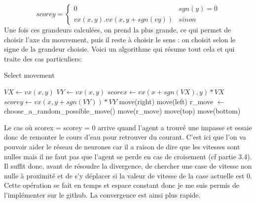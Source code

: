 \documentclass[10pt]{article}
\begin{document}
\[scorey = 
\begin{cases}
	0 & sgn(y) = 0 \\
	vx(x,y).vx(x,y+sgn(vy)) & sinon
\end{cases}
\]
Une fois ces grandeurs calculées, on prend la plus grande, ce qui permet de choisir l'axe du mouvement, puis il reste à choisir le sens : on choisit selon le signe de la grandeur choisie. Voici un algorithme qui résume tout cela et qui traite des cas particuliers:
\begin{algorithm}
\caption{Select movement}
\begin{algorithmic}
\STATE $VX \leftarrow vx(x,y)$
\STATE $VY \leftarrow vx(x,y)$
\STATE $scorex \leftarrow vx(x+sgn(VX),y)*VX$
\STATE $scorey \leftarrow vx(x,y+sgn(VY))*VY$
\STATE move(right)
\ELSE 
\STATE move(left)
\ENDIF
\ELSE
{}
\STATE r\_move $\leftarrow$ choose\_a\_random\_possible\_move()
\STATE move(r\_move)
\ELSE
{}
\STATE move(top)
\ELSE
\STATE move(bottom)
\ENDIF
\ENDIF
\ENDIF
\end{algorithmic}
\end{algorithm}

Le cas où scorex = scorey = 0 arrive quand l'agent a trouvé une impasse et essaie donc de remonter le cours d'eau pour retrouver du courant. C'est ici que l'on va pouvoir aider le réseau de neurones car il a raison de dire que les vitesses sont nulles mais il ne faut pas que l'agent se perde en cas de croisement (cf partie 3.4). Il suffit donc, avant de résoudre la divergence, de chercher une case de vitesse non nulle à proximité et de s'y déplacer si la valeur de vitesse de la case actuelle est 0. Cette opération se fait en temps et espace constant donc je me suis permis de l'implémenter sur le github. La convergence est ainsi plus rapide.
\end{document}
